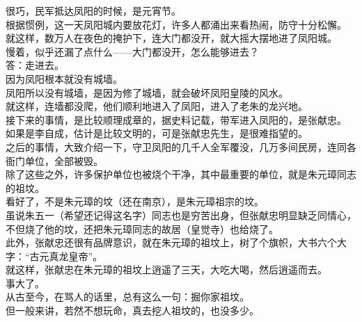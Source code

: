 \begin{multicols}{\theparacolNo}
很巧，民军抵达凤阳的时候，是元宵节。\\

根据惯例，这一天凤阳城内要放花灯，许多人都涌出来看热闹，防守十分松懈。\\

就这样，数万人在夜色的掩护下，连大门都没开，就大摇大摆地进了凤阳城。\\

慢着，似乎还漏了点什么——大门都没开，怎么能够进去？\\

答：走进去。\\

因为凤阳根本就没有城墙。\\

凤阳所以没有城墙，是因为修了城墙，就会破坏凤阳皇陵的风水。\\

就这样，连墙都没爬，他们顺利地进入了凤阳，进入了老朱的龙兴地。\\

接下来的事情，是比较顺理成章的，据史料记载，带军进入凤阳的，是张献忠。\\

如果是李自成，估计是比较文明的，可是张献忠先生，是很难指望的。\\

之后的事情，大致介绍一下，守卫凤阳的几千人全军覆没，几万多间民房，连同各衙门单位，全部被毁。\\

除了这些之外，许多保护单位也被烧个干净，其中最重要的单位，就是朱元璋同志的祖坟。\\

看好了，不是朱元璋的坟（还在南京），是朱元璋祖宗的坟。\\

虽说朱五一（希望还记得这名字）同志也是穷苦出身，但张献忠明显缺乏同情心，不但烧了他的坟，还把朱元璋同志的故居（皇觉寺）也给烧了。\\

此外，张献忠还很有品牌意识，就在朱元璋的祖坟上，树了个旗帜，大书六个大字：“古元真龙皇帝”。\\

就这样，张献忠在朱元璋的祖坟上逍遥了三天，大吃大喝，然后逍遥而去。\\

事大了。\\

从古至今，在骂人的话里，总有这么一句：掘你家祖坟。\\

但一般来讲，若然不想玩命，真去挖人祖坟的，也没多少。\\


\end{multicols}

